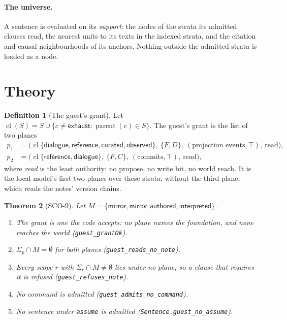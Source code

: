 \documentclass[11pt]{article}
\theoremstyle{plain}
\newtheorem{theorem}{Theorem}[section]
\theoremstyle{definition}
\newtheorem{definition}[theorem]{Definition}
\theoremstyle{remark}
\newcommand{\lean}[1]{\texttt{#1}}
\newcommand{\str}[1]{\textsf{#1}}
\begin{document}
\paragraph{The universe.}
A sentence is evaluated on its \emph{support}: the nodes of the strata its admitted clauses read,
the nearest units to its texts in the indexed strata, and the citation and causal neighbourhoods
of its anchors. Nothing outside the admitted strata is loaded as a node.

\section{Theory}

\begin{definition}[The guest's grant]
Let $\operatorname{cl}(S) = S \cup \{c \ne \str{exhaust} : \operatorname{parent}(c) \in S\}$. The
guest's grant is the list of two planes
\begin{align*}
  p_1 &= \bigl(\operatorname{cl}\{\str{dialogue}, \str{reference}, \str{curated},
          \str{observed}\},\ \{F, D\},\ (\text{projection events}, \top),\ \text{read}\bigr),\\
  p_2 &= \bigl(\operatorname{cl}\{\str{reference}, \str{dialogue}\},\ \{F, C\},\
          (\text{commits}, \top),\ \text{read}\bigr),
\end{align*}
where \emph{read} is the least authority: no propose, no write bit, no world reach. It is the
local model's first two planes over these strata, without the third plane, which reads the
notes' version chains.
\end{definition}

\begin{theorem}[SCO-9]\label{thm:guest}
Let $M = \{\str{mirror}, \str{mirror\_authored}, \str{interpreted}\}$.
\begin{enumerate}
  \item The grant is one the code accepts: no plane names the foundation, and none reaches the
        world (\lean{guest\_grantOk}).
  \item $\Sigma_{p} \cap M = \emptyset$ for both planes (\lean{guest\_reads\_no\_note}).
  \item Every scope $r$ with $\Sigma_r \cap M \ne \emptyset$ lies under no plane, so a clause that
        requires it is refused (\lean{guest\_refuses\_note}).
  \item No command is admitted (\lean{guest\_admits\_no\_command}).
  \item No sentence under \texttt{assume} is admitted (\lean{Sentence.guest\_no\_assume}).
\end{enumerate}
\end{theorem}
\end{document}
